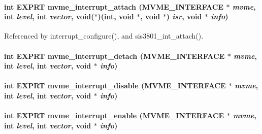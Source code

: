 \paragraph[{mvme\_\-interrupt\_\-attach}]{\setlength{\rightskip}{0pt plus 5cm}int EXPRT mvme\_\-interrupt\_\-attach ({\bf MVME\_\-INTERFACE} $\ast$ {\em mvme}, \/  int {\em level}, \/  int {\em vector}, \/  void($\ast$)(int, void $\ast$, void $\ast$) {\em isr}, \/  void $\ast$ {\em info})}\hfill\label{group__mvmestdfunctionh_gae1e6cd30960647ba33cb1fc2e8d8cba8}


Referenced by interrupt\_\-configure(), and sis3801\_\-int\_\-attach().
\paragraph[{mvme\_\-interrupt\_\-detach}]{\setlength{\rightskip}{0pt plus 5cm}int EXPRT mvme\_\-interrupt\_\-detach ({\bf MVME\_\-INTERFACE} $\ast$ {\em mvme}, \/  int {\em level}, \/  int {\em vector}, \/  void $\ast$ {\em info})}\hfill\label{group__mvmestdfunctionh_ga5c177a072044d62cccdc0c184e1fa806}
\paragraph[{mvme\_\-interrupt\_\-disable}]{\setlength{\rightskip}{0pt plus 5cm}int EXPRT mvme\_\-interrupt\_\-disable ({\bf MVME\_\-INTERFACE} $\ast$ {\em mvme}, \/  int {\em level}, \/  int {\em vector}, \/  void $\ast$ {\em info})}\hfill\label{group__mvmestdfunctionh_gadfd3c45ffc893aef499ed3358b07ddac}
\paragraph[{mvme\_\-interrupt\_\-enable}]{\setlength{\rightskip}{0pt plus 5cm}int EXPRT mvme\_\-interrupt\_\-enable ({\bf MVME\_\-INTERFACE} $\ast$ {\em mvme}, \/  int {\em level}, \/  int {\em vector}, \/  void $\ast$ {\em info})}\hfill\label{group__mvmestdfunctionh_ga1d5f339e96aefb7506a3f566e0dbff0b}

